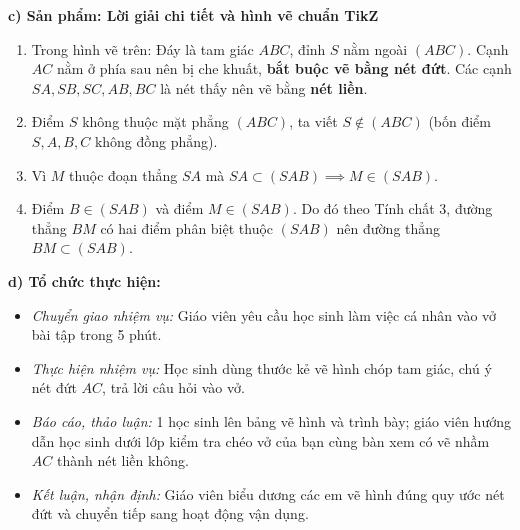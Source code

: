 \documentclass[12pt, a4paper]{article}
\begin{document}
\noindent \textbf{c) Sản phẩm: Lời giải chi tiết và hình vẽ chuẩn TikZ}
\begin{center}
\end{center}
\begin{enumerate}[leftmargin=0.6cm]
    \item Trong hình vẽ trên: Đáy là tam giác $ABC$, đỉnh $S$ nằm ngoài $(ABC)$. Cạnh $AC$ nằm ở phía sau nên bị che khuất, \textbf{bắt buộc vẽ bằng nét đứt}. Các cạnh $SA, SB, SC, AB, BC$ là nét thấy nên vẽ bằng \textbf{nét liền}.
    \item Điểm $S$ không thuộc mặt phẳng $(ABC)$, ta viết $S \notin (ABC)$ (bốn điểm $S, A, B, C$ không đồng phẳng).
    \item Vì $M$ thuộc đoạn thẳng $SA$ mà $SA \subset (SAB) \implies M \in (SAB)$.
    \item Điểm $B \in (SAB)$ và điểm $M \in (SAB)$. Do đó theo Tính chất 3, đường thẳng $BM$ có hai điểm phân biệt thuộc $(SAB)$ nên đường thẳng $BM \subset (SAB)$.
\end{enumerate}

\noindent \textbf{d) Tổ chức thực hiện:}
\begin{itemize}[leftmargin=0.8cm]
    \item \textit{Chuyển giao nhiệm vụ:} Giáo viên yêu cầu học sinh làm việc cá nhân vào vở bài tập trong 5 phút.
    \item \textit{Thực hiện nhiệm vụ:} Học sinh dùng thước kẻ vẽ hình chóp tam giác, chú ý nét đứt $AC$, trả lời câu hỏi vào vở.
    \item \textit{Báo cáo, thảo luận:} 1 học sinh lên bảng vẽ hình và trình bày; giáo viên hướng dẫn học sinh dưới lớp kiểm tra chéo vở của bạn cùng bàn xem có vẽ nhầm $AC$ thành nét liền không.
    \item \textit{Kết luận, nhận định:} Giáo viên biểu dương các em vẽ hình đúng quy ước nét đứt và chuyển tiếp sang hoạt động vận dụng.
\end{itemize}
\end{document}
